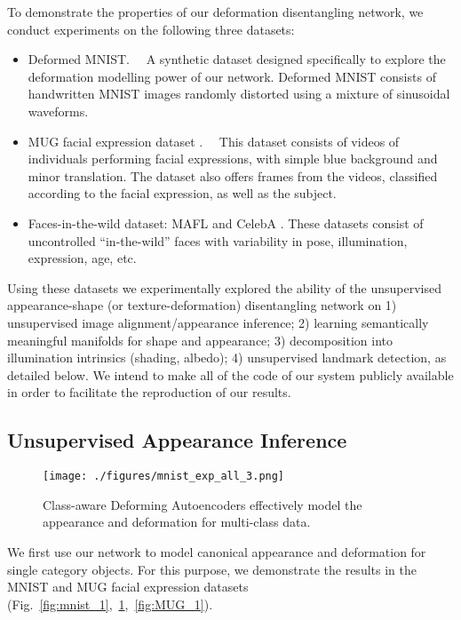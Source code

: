 \documentclass[runningheads]{llncs}
\begin{document}
To demonstrate the properties of our deformation disentangling network, we conduct experiments on the following three datasets:
\begin{itemize}
\item Deformed MNIST.  ~~A synthetic dataset designed specifically to explore the deformation modelling power of our network. Deformed MNIST consists of 
      handwritten MNIST images randomly distorted using a mixture of sinusoidal waveforms. 
\item MUG facial expression dataset \cite{mugfacialexpr}. ~~This dataset consists of videos of individuals performing facial expressions, with simple blue background and minor translation. The dataset also offers frames from the videos, classified according to the facial expression, as well as the subject.
\item Faces-in-the-wild dataset: MAFL \cite{xiaooutangmafldataset} and CelebA \cite{liu2015faceattributes}. These datasets consist of uncontrolled ``in-the-wild'' faces with variability in  pose, illumination, expression, age, etc.
\end{itemize}

Using these datasets we  experimentally explored the ability of the unsupervised appearance-shape (or texture-deformation) disentangling network on 1) unsupervised image alignment/appearance inference; 2) learning semantically meaningful manifolds for shape and appearance; 3) decomposition into illumination intrinsics (shading, albedo); 4) unsupervised landmark detection, as detailed below. We intend to make all of the code of our system publicly available in order to facilitate the reproduction of our results. 

\subsection{Unsupervised Appearance Inference}

\begin{figure}
    \centering
    \texttt{[image: ./figures/mnist\_exp\_all\_3.png]}
    \caption{Class-aware Deforming Autoencoders effectively model the appearance and deformation for multi-class data.}
    \label{fig:mnist_all}
\end{figure}

We first use our network to model canonical appearance and deformation for single category objects. For this purpose, we demonstrate the results in the MNIST and MUG facial expression datasets (Fig.~\ref{fig:mnist_1},~\ref{fig:mnist_all},~\ref{fig:MUG_1}).
\end{document}
